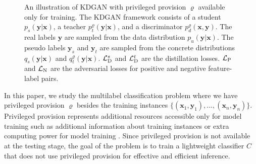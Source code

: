 \documentclass{article}
\newcommand{\OVEC}[1]{\bm{#1}} %
\newcommand{\SVEC}[1]{\bm{#1}} %
\newcommand{\LOSS}[2]{\mathcal{#1}_{\rm{#2}}} %
\newcommand{\EXP}{\mathbb{E}} %
\newcommand{\stddistloss}{\LOSS{L}{D}^{s}}
\newcommand{\tchdistloss}{\LOSS{L}{D}^{t}}
\newcommand{\classifier}{C}
\newcommand{\abbrpdat}{p_{u}}
\newcommand{\fullpdat}{p_{u}(\OVEC{y}|\OVEC{x})}
\newcommand{\abbrpstd}{p_{s}}
\newcommand{\fullpstd}[1]{p_{s}(#1|\OVEC{x})}
\newcommand{\fullqstd}[1]{q_{s}(#1|\OVEC{x})}
\newcommand{\abbrptch}{p_{t}^{\varrho}}
\newcommand{\fullptch}[1]{p_{t}^{\varrho}(#1|\OVEC{x})}
\newcommand{\fullqtch}[1]{q_{t}^{\varrho}(#1|\OVEC{x})}
\newcommand{\fullpdis}[1]{p_{d}^{\varrho}(\OVEC{x},#1)}
\begin{document}
\begin{figure}[tbp]
\caption{
An illustration of KDGAN with privileged provision $\varrho$ available only for training.
The KDGAN framework consists of a student $\fullpstd{\OVEC{y}}$, a teacher $\fullptch{\OVEC{y}}$, and a discriminator  $\fullpdis{\OVEC{y}}$.
The real labels $\OVEC{y}$ are sampled from the data distribution $\fullpdat$.
The pseudo labels $\SVEC{y}_{s}$ and $\SVEC{y}_{t}$ are sampled from the concrete distributions $\fullqstd{\OVEC{y}}$ and $\fullqtch{\OVEC{y}}$.
$\stddistloss$ and $\tchdistloss$ are the distillation losses.
$\LOSS{L}{P}$ and $\LOSS{L}{N}$ are the adversarial losses for positive and negative feature-label pairs.
}
\label{fig:kdgan}
\end{figure}

In this paper, we study the multilabel classification problem \cite{hinton2015distilling,lopez2015unifying,vapnik2015learning} where we have privileged provision $\varrho$ besides the training instances $\{(\OVEC{x}_{1},\OVEC{y}_{1}),...,(\OVEC{x}_{n},\OVEC{y}_{n})\}$.
Privileged provision represents additional resources accessible only for model training such as additional information about training instances \cite{vapnik2015learning} or extra computing power for model training \cite{ba2014deep,hinton2015distilling,sau2016deep}.
Since privileged provision is not available at the testing stage, the goal of the problem is to train a lightweight classifier $\classifier$ that does not use privileged provision for effective and efficient inference.
\end{document}
